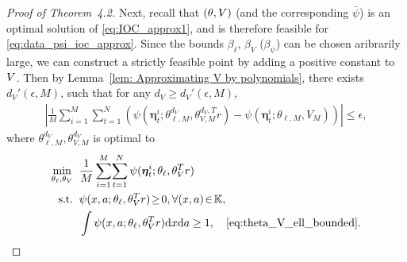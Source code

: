 \begin{proof}[Proof of Theorem~4.2]
Next, recall that $(\relax{\theta}, \relax{V})$ (and the corresponding $\bar\psi$) is an optimal solution of \eqref{eq:IOC_approx1}, and is therefore feasible for \eqref{eq:data_psi_ioc_approx}.
Since the bounds $\beta_\ell$, $\beta_V$ ($\beta_\psi$) can be chosen aribrarily large, we can construct a strictly feasible point by adding a positive constant to $\relax{V}$. 
Then by Lemma~\ref{lem: Approximating V by polynomials}, there exists $d_V'(\epsilon,M)$, such that for any $d_V\geq d_V'(\epsilon,M)$,
\begin{align}
    \left| \!\frac{1}{M}\sum_{i=1}^M\!\sum_{t=1}^N\left(\psi(\bm\eta_t^i;\theta_{\ell,M}^{d_V},\theta_{V,M}^{d_V,T}r)\!-\!\psi(\bm\eta_t^i;\theta_{\ell,M},V_M)\right)\!\right|\!\leq\!\epsilon,\label{eq: dv approx}
\end{align}
where $ \theta_{\ell,M}^{d_V},\theta_{V,M}^{d_V} $ is optimal to
\begin{equation}
\begin{aligned}
\min_{\theta_{\ell},\theta_V} &\;\;\frac{1}{M}\sum_{i=1}^M\!\sum_{t=1}^N\psi(\bm\eta_t^i;\theta_\ell,\theta_V^Tr)\\
\st &\;\; \psi(x,a;\theta_\ell,\theta_V^Tr)\!\ge\! 0,\forall (x,a)\!\in\!\mK,\\
&\;\;\int \psi(x,a;\theta_\ell,\theta_V^Tr) \mathrm dx\mathrm da\ge 1,\quad \eqref{eq:theta_V_ell_bounded}.
\end{aligned}
\label{eq:data_psi_f_ioc_approx}
\end{equation}


\end{proof}

